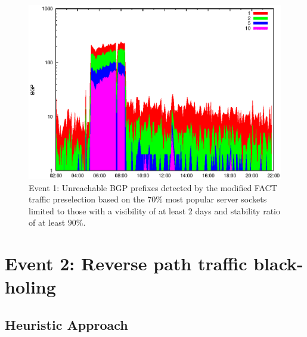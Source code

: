 \begin{figure}
	[ht] \centering 
	\includegraphics[width=0.75\linewidth]{images/events/2010_03_25/bgp_log_Set_var_0_1_stab_9_vts_2.eps}
	\caption{Event 1: Unreachable BGP prefixes detected by the modified FACT traffic preselection based on the $70\%$ most popular server sockets limited to those with a visibility of at least 2 days and stability ratio of at least $90\%$.} 
	\label{fig:AMS_IX_FACT_popularVTS2STAB9} 
\end{figure}


\newpage
\section{Event 2: Reverse path traffic black-holing}


\subsection{Heuristic Approach}

